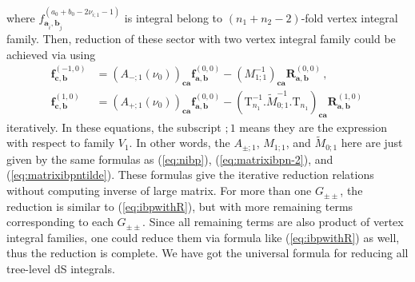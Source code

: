 \documentclass[a4paper,11pt]{article}
\newcommand{\nn}{\nonumber}
\def\eqref#1{(\ref{#1})}
\begin{document}
where $f^{(a_0+b_0-2\nu_{i;1}-1)}_{\bm{a}_{\hat{i}},\bm{b}_{\hat{j}} }$ is integral belong to $(n_1+n_2-2)$-fold vertex integral family.
Then, reduction of these sector with two vertex integral family could be achieved via using 
\begin{align}
\bm{f}^{(-1,0)}_{\bm{c},\bm{b}}
&= \left(A_{-;1}(\nu_0)\right)_{\bm{c}\bm{a}} \bm{f}^{(0,0)}_{\bm{a},\bm{b}} 
- \left(M_{1;1}^{-1}\right)_{\bm{c}\bm{a}}\bm{R}^{(0,0)}_{\bm{a},\bm{b}}   \, ,\nn\\
\bm{f}^{(1,0)}_{\bm{c},\bm{b}}
&=\left( A_{+;1}(\nu_0)\right)_{\bm{c}\bm{a}}  \bm{f}^{(0,0)}_{\bm{a},\bm{b}}
-\left(\text{T}_{n_1}^{-1}.\tilde{M}_{0;1}^{-1}.\text{T}_{n_1}\right)_{\bm{c}\bm{a}}\bm{R}^{(1,0)}_{\bm{a},\bm{b}} \, \label{eq:ibpwithR}
\end{align}
iteratively. In these equations, the subscript $;1$ means they are the expression with respect to family $V_1$. In other words, the $A_{\pm;1}$, $M_{1;1}$, and $\tilde{M}_{0;1}$ here are just given by the same formulas as \eqref{eq:nibp}, \eqref{eq:matrixibpn-2}, and \eqref{eq:matrixibpntilde}. These formulas give the iterative reduction relations without computing  inverse of large matrix. For more than one $G_{\pm\pm}$, the reduction is similar to \eqref{eq:ibpwithR}, but with more remaining terms corresponding to each $G_{\pm\pm}$. Since all remaining terms are also product of vertex integral families, one could reduce them via formula like \eqref{eq:ibpwithR} as well, thus the reduction is complete.
We have got the universal formula for reducing all tree-level dS integrals.

\end{document}
